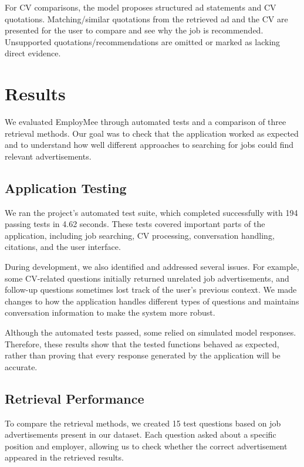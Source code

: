 \documentclass[a4paper,10pt]{article}
\begin{document}
For CV comparisons, the model proposes structured ad statements and CV quotations. Matching/similar quotations from the retrieved ad and the CV are presented for the user to compare and see why the job is recommended. Unsupported quotations/recommendations are omitted or marked as lacking direct evidence. 


\section{Results}

We evaluated EmployMee through automated tests and a comparison of three retrieval methods. Our goal was to check that the application worked as expected and to understand how well different approaches to searching for jobs could find relevant advertisements.

\subsection{Application Testing}

We ran the project's automated test suite, which completed successfully with 194 passing tests in 4.62 seconds. These tests covered important parts of the application, including job searching, CV processing, conversation handling, citations, and the user interface.

During development, we also identified and addressed several issues. For example, some CV-related questions initially returned unrelated job advertisements, and follow-up questions sometimes lost track of the user's previous context. We made changes to how the application handles different types of questions and maintains conversation information to make the system more robust.

Although the automated tests passed, some relied on simulated model responses. Therefore, these results show that the tested functions behaved as expected, rather than proving that every response generated by the application will be accurate.

\subsection{Retrieval Performance}

To compare the retrieval methods, we created 15 test questions based on job advertisements present in our dataset. Each question asked about a specific position and employer, allowing us to check whether the correct advertisement appeared in the retrieved results.
\end{document}
